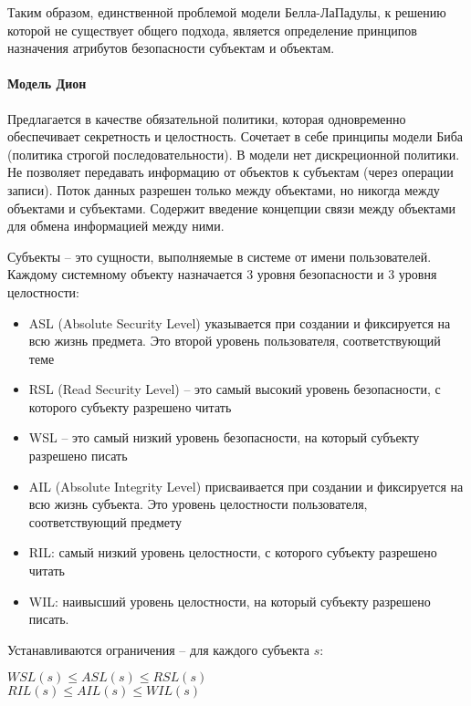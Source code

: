 Таким образом, единственной проблемой модели Белла-ЛаПадулы, к решению которой не существует общего подхода, является определение принципов назначения атрибутов безопасности субъектам и объектам. 

\paragraph{Модель Дион}

Предлагается в качестве обязательной политики, которая одновременно обеспечивает секретность и целостность. 
Сочетает в себе принципы модели Биба (политика строгой последовательности). В модели нет дискреционной 
политики. Не позволяет передавать информацию от объектов к субъектам (через операции записи). Поток данных 
разрешен только между объектами, но никогда между объектами и субъектами. Содержит введение концепции связи между 
объектами для обмена информацией между ними.

Субъекты -- это сущности, выполняемые в системе от имени пользователей. Каждому системному объекту назначается 
3 уровня безопасности и 3 уровня целостности:
\begin{itemize}
    \item ASL (Absolute Security Level) указывается при создании и фиксируется на всю жизнь предмета. Это второй уровень 
    пользователя, соответствующий теме
    \item RSL (Read Security Level) -- это самый высокий уровень безопасности, с которого субъекту разрешено читать
    \item WSL -- это самый низкий уровень безопасности, на который субъекту разрешено писать
    \item AIL (Absolute Integrity Level) присваивается при создании и фиксируется на всю жизнь субъекта. Это уровень 
    целостности пользователя, соответствующий предмету
    \item RIL: самый низкий уровень целостности, с которого субъекту разрешено читать
    \item WIL: наивысший уровень целостности, на который субъекту разрешено писать.
\end{itemize}

Устанавливаются ограничения -- для каждого субъекта $s$:

\begin{center}
$WSL(s) \leqslant ASL(s) \leq RSL(s)$ \\
$RIL(s) \leqslant AIL(s) \leq WIL(s)$
\end{center}

